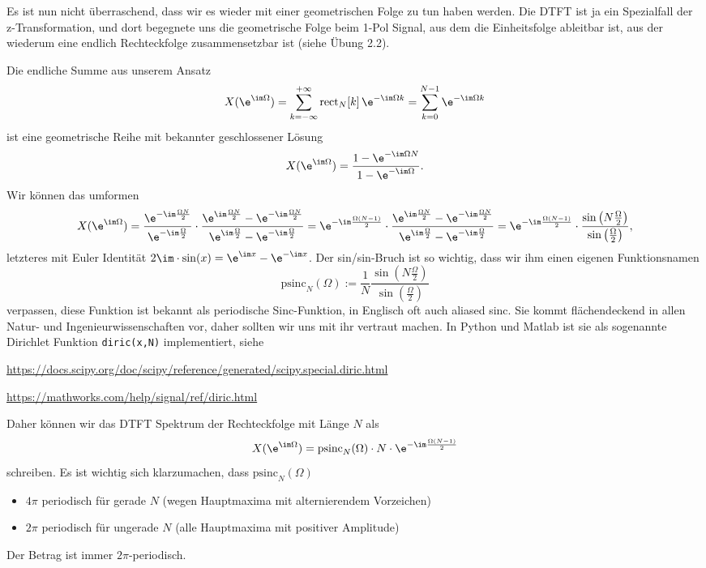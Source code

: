 \begin{ExCalc}
Es ist nun nicht überraschend, dass wir es wieder mit einer geometrischen
Folge zu tun haben werden.
%
Die DTFT ist ja ein Spezialfall der z-Transformation, und dort begegnete uns
die geometrische Folge beim 1-Pol Signal, aus dem die Einheitsfolge ableitbar ist,
aus der wiederum eine endlich Rechteckfolge zusammensetzbar ist (siehe Übung 2.2).

Die endliche Summe aus unserem Ansatz
\begin{align}
X(\e^{\im\Omega})
= \sum_{k=-\infty}^{+\infty} \mathrm{rect}_N[k] \, \e^{-\im\Omega k} = \sum_{k=0}^{N-1} \e^{-\im\Omega k}
\end{align}
ist eine geometrische Reihe mit bekannter geschlossener Lösung
\begin{equation}
X(\e^{\im\Omega})=\frac{1-\e^{-\im\Omega N}}{1-\e^{-\im\Omega}}.
\end{equation}
%
Wir können das umformen
%
\begin{equation}
X(\e^{\im\Omega})=\frac{\e^{-\im\frac{\Omega N}{2}}}{\e^{-\im\frac{\Omega}{2}}}\cdot\frac{\e^{\im\frac{\Omega N}{2}}-\e^{-\im\frac{\Omega N}{2}}}{\e^{\im\frac{\Omega}{2}}-\e^{-\im\frac{\Omega}{2}}}
=\e^{-\im\frac{\Omega(N-1)}{2}}\cdot\frac{\e^{\im\frac{\Omega N}{2}}-\e^{-\im\frac{\Omega N}{2}}}{\e^{\im\frac{\Omega}{2}}-\e^{-\im\frac{\Omega}{2}}}
=\e^{-\im\frac{\Omega(N-1)}{2}}\cdot\frac{\sin\left(N\frac{\Omega}{2}\right)}{\sin\left(\frac{\Omega}{2}\right)},
\end{equation}
%
letzteres mit Euler Identität $2\im\cdot\sin(x)=\e^{\im x}-\e^{-\im x}$.
%
Der sin/sin-Bruch ist so wichtig, dass wir ihm einen eigenen Funktionsnamen
\begin{equation}
\mathrm{psinc}_N(\Omega) := \frac{1}{N}\frac{\sin\left(N\frac{\Omega}{2}\right)}{\sin\left(\frac{\Omega}{2}\right)}
\end{equation}
verpassen, diese Funktion ist bekannt als periodische Sinc-Funktion, in Englisch
oft auch aliased sinc.
%
Sie kommt flächendeckend in allen Natur- und Ingenieurwissenschaften vor, daher
sollten wir uns mit ihr vertraut machen.
%
In Python und Matlab ist sie als sogenannte Dirichlet Funktion \texttt{diric(x,N)}
implementiert, siehe

\url{https://docs.scipy.org/doc/scipy/reference/generated/scipy.special.diric.html}

\url{https://mathworks.com/help/signal/ref/diric.html}

Daher können wir das DTFT Spektrum der Rechteckfolge mit Länge $N$ als
\begin{equation}
X(\e^{\im\Omega})=
\mathrm{psinc}_N(\Omega) \cdot N \cdot \e^{-\im\frac{\Omega(N-1)}{2}}
\end{equation}
schreiben.
%
Es ist wichtig sich klarzumachen, dass $\mathrm{psinc}_N(\Omega)$
\begin{itemize}
\item $4\pi$ periodisch für gerade $N$ (wegen Hauptmaxima mit alternierendem Vorzeichen)
\item $2\pi$ periodisch für ungerade $N$ (alle Hauptmaxima mit positiver Amplitude)
\end{itemize}
Der Betrag ist immer $2\pi$-periodisch.
\end{ExCalc}


